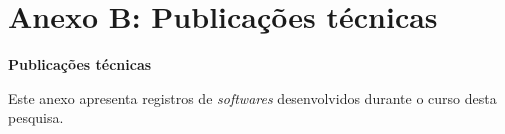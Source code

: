 \chapter{Anexo B: Publicações técnicas}
\label{an:b}
\begin{center}
    \textbf{Publicações técnicas}
\end{center}

Este anexo apresenta registros de \emph{softwares} desenvolvidos durante o curso desta pesquisa.


